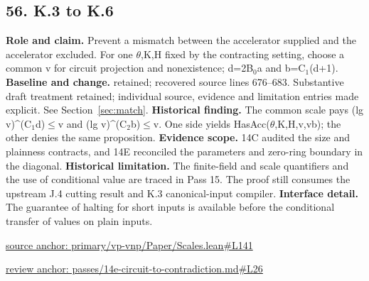 \documentclass[11pt,letterpaper]{article}
\theoremstyle{definition}\newtheorem{definition}[theorem]{Definition}\newtheorem{example}[theorem]{Example}
\theoremstyle{remark}\newtheorem{remark}[theorem]{Remark}
\begin{document}
\subsection*{56. K.3 to K.6}
\textbf{Role and claim.} Prevent a mismatch between the accelerator supplied and the accelerator excluded. For one \ensuremath{\theta},K,H fixed by the contracting setting, choose a common v for circuit projection and nonexistence; d=2B\ensuremath{{}_0}a and b=C\ensuremath{{}_1}(d+1).
\textbf{Baseline and change.} retained; recovered source lines 676--683. Substantive draft treatment retained; individual source, evidence and limitation entries made explicit. See Section~\ref{sec:match}.
\textbf{Historical finding.} The common scale pays (lg v)\textasciicircum{}(C\ensuremath{{}_1}d)\ensuremath{\le}v and (lg v)\textasciicircum{}(C\ensuremath{{}_2}b)\ensuremath{\le}v. One side yields HasAcc(\ensuremath{\theta},K,H,v,vb); the other denies the same proposition.
\textbf{Evidence scope.} 14C audited the size and plainness contracts, and 14E reconciled the parameters and zero-ring boundary in the diagonal.
\textbf{Historical limitation.} The finite-field and scale quantifiers and the use of conditional value are traced in Pass 15. The proof still consumes the upstream J.4 cutting result and K.3 canonical-input compiler.
\textbf{Interface detail.} The guarantee of halting for short inputs is available before the conditional transfer of values on plain inputs.
\par\href{https://github.com/nousentllc/VP-VNP-Review/blob/8a7976933b6b2b4ffda1ad3a0dfb5fc6b6f023e8/primary/vp-vnp/Paper/Scales.lean\#L141}{source anchor: primary/vp-vnp/Paper/Scales.lean\#L141}
\par\href{https://github.com/nousentllc/VP-VNP-Review/blob/8a7976933b6b2b4ffda1ad3a0dfb5fc6b6f023e8/passes/14e-circuit-to-contradiction.md\#L26}{review anchor: passes/14e-circuit-to-contradiction.md\#L26}
\goodbreak
\end{document}
